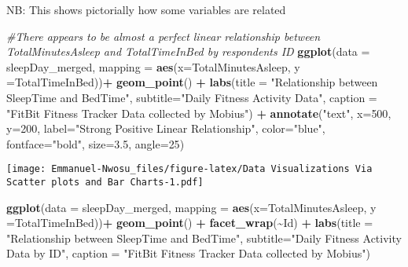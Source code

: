 \documentclass[
]{article}
\newenvironment{Shaded}{\begin{snugshade}}{\end{snugshade}}
\newcommand{\AttributeTok}[1]{\textcolor[rgb]{0.13,0.29,0.53}{#1}}
\newcommand{\CommentTok}[1]{\textcolor[rgb]{0.56,0.35,0.01}{\textit{#1}}}
\newcommand{\DecValTok}[1]{\textcolor[rgb]{0.00,0.00,0.81}{#1}}
\newcommand{\FloatTok}[1]{\textcolor[rgb]{0.00,0.00,0.81}{#1}}
\newcommand{\FunctionTok}[1]{\textcolor[rgb]{0.13,0.29,0.53}{\textbf{#1}}}
\newcommand{\NormalTok}[1]{#1}
\newcommand{\SpecialCharTok}[1]{\textcolor[rgb]{0.81,0.36,0.00}{\textbf{#1}}}
\newcommand{\StringTok}[1]{\textcolor[rgb]{0.31,0.60,0.02}{#1}}
\begin{document}
NB: This shows pictorially how some variables are related

\begin{Shaded}
\begin{Highlighting}[]
\CommentTok{\#There appears to be almost a perfect linear relationship between TotalMinutesAsleep and TotalTimeInBed by respondents ID}
\FunctionTok{ggplot}\NormalTok{(}\AttributeTok{data =}\NormalTok{ sleepDay\_merged, }\AttributeTok{mapping =} \FunctionTok{aes}\NormalTok{(}\AttributeTok{x=}\NormalTok{TotalMinutesAsleep, }\AttributeTok{y =}\NormalTok{TotalTimeInBed))}\SpecialCharTok{+} \FunctionTok{geom\_point}\NormalTok{() }\SpecialCharTok{+} \FunctionTok{labs}\NormalTok{(}\AttributeTok{title =} \StringTok{"Relationship between SleepTime and BedTime"}\NormalTok{, }\AttributeTok{subtitle=}\StringTok{"Daily Fitness Activity Data"}\NormalTok{, }\AttributeTok{caption =} \StringTok{"FitBit Fitness Tracker Data collected by Mobius"}\NormalTok{) }\SpecialCharTok{+}   \FunctionTok{annotate}\NormalTok{(}\StringTok{"text"}\NormalTok{, }\AttributeTok{x=}\DecValTok{500}\NormalTok{, }\AttributeTok{y=}\DecValTok{200}\NormalTok{, }\AttributeTok{label=}\StringTok{"Strong Positive Linear Relationship"}\NormalTok{, }\AttributeTok{color=}\StringTok{"blue"}\NormalTok{, }\AttributeTok{fontface=}\StringTok{"bold"}\NormalTok{, }\AttributeTok{size=}\FloatTok{3.5}\NormalTok{, }\AttributeTok{angle=}\DecValTok{25}\NormalTok{)}
\end{Highlighting}
\end{Shaded}

\texttt{[image: Emmanuel-Nwosu\_files/figure-latex/Data Visualizations Via Scatter plots and Bar Charts-1.pdf]}

\begin{Shaded}
\begin{Highlighting}[]
\FunctionTok{ggplot}\NormalTok{(}\AttributeTok{data =}\NormalTok{ sleepDay\_merged, }\AttributeTok{mapping =} \FunctionTok{aes}\NormalTok{(}\AttributeTok{x=}\NormalTok{TotalMinutesAsleep, }\AttributeTok{y =}\NormalTok{TotalTimeInBed))}\SpecialCharTok{+} \FunctionTok{geom\_point}\NormalTok{() }\SpecialCharTok{+} \FunctionTok{facet\_wrap}\NormalTok{(}\SpecialCharTok{\textasciitilde{}}\NormalTok{Id) }\SpecialCharTok{+} \FunctionTok{labs}\NormalTok{(}\AttributeTok{title =} \StringTok{"Relationship between SleepTime and BedTime"}\NormalTok{, }\AttributeTok{subtitle=}\StringTok{"Daily Fitness Activity Data by ID"}\NormalTok{, }\AttributeTok{caption =} \StringTok{"FitBit Fitness Tracker Data collected by Mobius"}\NormalTok{) }
\end{Highlighting}
\end{Shaded}
\end{document}
